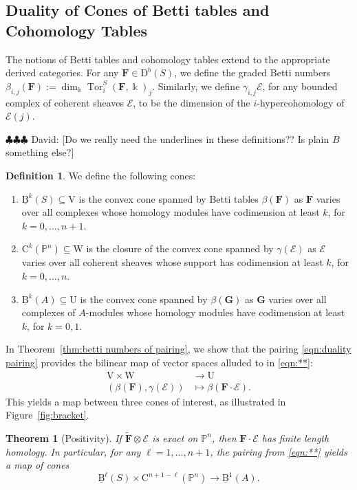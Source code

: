 \documentclass[12pt]{amsart}
\newtheorem{thm}[lemma]{Theorem}
\theoremstyle{definition}
\newtheorem{defn}[lemma]{Definition}
\theoremstyle{remark}
\newcommand{\Tor}{\operatorname{Tor}}
\newcommand{\kk}{\Bbbk}
\newcommand{\PP}{\mathbb{P}}
\newcommand{\UU}{\mathrm{U}}
\newcommand{\VV}{\mathrm{V}}
\newcommand{\WW}{\mathrm{W}}
\newcommand{\cE}{\mathcal{E}}
\newcommand{\FF}{\mathbf{F}}
\newcommand{\Gbull}{\mathbf{G}}
\newcommand{\DD}{\mathrm{D}}
\newcommand{\CQ}{\mathrm{C}}
\newcommand{\BBQ}{\underline{\mathrm{B}}}
\newcommand{\david}[1]{{\color{red} \sf $\clubsuit\clubsuit\clubsuit$ David: [#1]}}
\begin{document}
\subsection{Duality of Cones of Betti tables and Cohomology Tables}
The notions of Betti tables and cohomology tables extend to the appropriate derived categories.  For any $\FF\in \DD^b(S)$, we define the graded Betti numbers $\beta_{i,j}(\FF):= \dim_\kk \Tor^S_i(\FF,\kk)_j$.  Similarly, we define  $\gamma_{i,j}\cE$, for any bounded complex of coherent sheaves $\cE$, to be the dimension of the $i$-hypercohomology  of $\cE(j)$.

\david{Do we really need the underlines in these definitions?? Is plain $B$ something else?}
\begin{defn}  We define the following cones:
\begin{enumerate}
	\item $\BBQ^{k}(S)\subseteq \VV$ is the convex cone spanned by Betti tables $\beta(\FF)$ as $\FF$ varies over all complexes whose homology modules have codimension at least $k$, for $k=0, \dots, n+1$.
	\item $\CQ^{k}(\PP^n)\subseteq \WW$ is the closure of the convex cone spanned by $\gamma(\cE)$ as $\cE$ varies over all coherent sheaves whose support has codimension at least $k$, for $k=0, \dots, n$.
	\item  $\BBQ^{k}(A)\subseteq \UU$ is the convex cone spanned by $\beta(\Gbull)$ as $\Gbull$ varies over all complexes of $A$-modules whose homology modules have codimension at least $k$, for $k=0,1$. 
\end{enumerate}
\end{defn}

In Theorem~\ref{thm:betti numbers of pairing}, we show that the pairing \eqref{eqn:duality pairing} provides the bilinear map of vector spaces alluded to in \eqref{eqn:**}:
\begin{align*}
\VV\times \WW & \to \UU\\
(\beta(\FF),\gamma(\cE))&\mapsto \beta(\FF\cdot \cE).
\end{align*}
This yields a map between three cones of interest, as illustrated in Figure~\ref{fig:bracket}.
\begin{thm}[Positivity]\label{thm:pos}
If $\widetilde{\FF} \otimes \cE$ is exact on $\PP^n$, then $\FF\cdot \cE$ has finite length homology.  In particular,
for any $\ell=1, \dots, n+1$, the pairing from \eqref{eqn:**} yields a map of cones
\[
\BBQ^{\ell}(S)\times \CQ^{n+1-\ell}(\PP^n)\to \BBQ^1(A).
\]
\end{thm}
\end{document}
